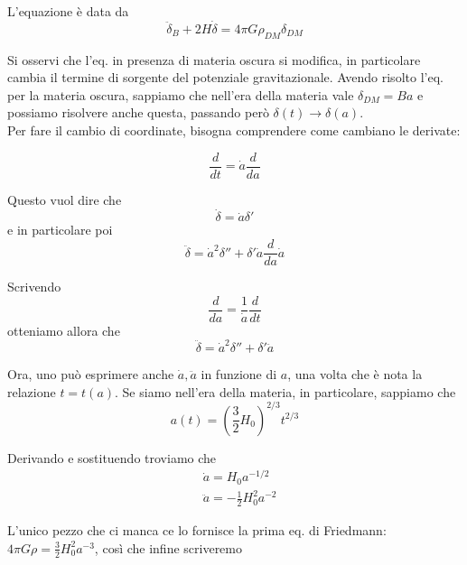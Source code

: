 \documentclass{report}
\begin{document}
L'equazione è data da 
\begin{equation}
    \ddot{\delta}_B  + 2H\dot{\delta} = 4\pi G \rho_{DM}\delta_{DM}
\end{equation}

Si osservi che l'eq. in presenza di materia oscura si modifica, in particolare cambia il termine di sorgente del potenziale gravitazionale. Avendo risolto l'eq. per la materia oscura, sappiamo che nell'era della materia vale $\delta_{DM} = Ba$ e possiamo risolvere anche questa, passando però $\delta(t) \rightarrow \delta(a)$. \\

Per fare il cambio di coordinate, bisogna comprendere come cambiano le derivate: 

\begin{equation}
    \frac{d}{dt} = \dot{a}\frac{d}{da}
\end{equation}

Questo vuol dire che 
\begin{equation}
    \dot{\delta} = \dot{a}\delta'
\end{equation}
e in particolare poi 
\begin{equation}
    \ddot{\delta} = \dot{a}^2 \delta'' + \delta' \dot{a}\frac{d}{da}\dot{a}
\end{equation}

Scrivendo 
\begin{equation}
    \frac{d}{da} = \frac{1}{\dot{a}}\frac{d}{dt}
\end{equation}
otteniamo allora che 
\begin{equation}
    \ddot{\delta} = \dot{a}^2 \delta'' + \delta' \ddot{a}
\end{equation}

Ora, uno può esprimere anche $\dot{a}, \ddot{a}$ in funzione di $a$, una volta che è nota la relazione $t = t(a)$. Se siamo nell'era della materia, in particolare, sappiamo che 
\begin{equation}
    a(t) = \left(\frac{3}{2}H_0 \right)^{2/3}t^{2/3}
\end{equation}

Derivando e sostituendo troviamo che 
\begin{align}
    &\dot{a} = H_0a^{-1/2} \\ &\ddot{a} = -\frac{1}{2}H_0^2 a^{-2}
\end{align}

L'unico pezzo che ci manca ce lo fornisce la prima eq. di Friedmann: $4\pi G \rho = \frac{3}{2}H_0^2 a^{-3}$, così che infine scriveremo 
\end{document}
